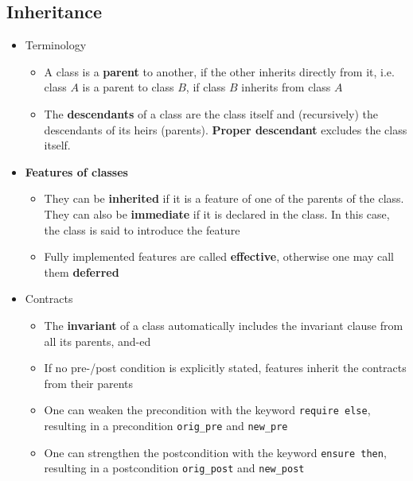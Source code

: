 \documentclass[a4paper]{article}
\newcommand{\inline}[1]{\lstinline!#1!}%
\begin{document}
\subsection{Inheritance}
\begin{itemize}
\item Terminology
\begin{itemize}
\item A class is a \textbf{parent} to another, if the other inherits directly from it, i.e. class $A$ is a parent to class $B$, if class $B$ inherits from class $A$
\item The \textbf{descendants} of a class are the class itself and (recursively) the descendants of its heirs (parents). \textbf{Proper descendant} excludes the class itself.
\end{itemize}
\item \textbf{Features of classes}
\begin{itemize}
\item They can be \textbf{inherited} if it is a feature of one of the parents of the class. They can also be \textbf{immediate} if it is declared in the class. In this case, the class is said to introduce the feature
\item Fully implemented features are called \textbf{effective}, otherwise one may call them \textbf{deferred}
\end{itemize}
\item Contracts 
\begin{itemize}
\item The \textbf{invariant} of a class automatically includes the invariant clause from all its parents, and-ed
\item If no pre-/post condition is explicitly stated, features inherit the contracts from their parents
\item One can weaken the precondition with the keyword \inline{require else}, resulting in a precondition \inline{orig_pre} and \inline{new_pre}
\item One can strengthen the postcondition with the keyword \inline{ensure then}, resulting in a postcondition \inline{orig_post} and \inline{new_post}
\end{itemize}
\end{itemize}
\end{document}
